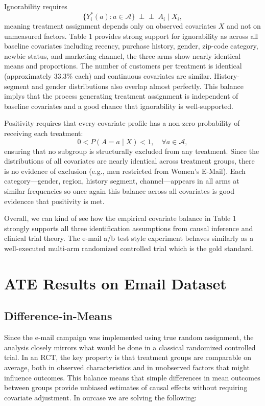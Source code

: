 \documentclass[10pt]{article}
\begin{document}
Ignorability requires
\[
\{Y_i^\ast(a) : a \in \mathcal{A}\} \;\perp\!\!\!\perp\; A_i \mid X_i,
\]
meaning treatment assignment depends only on observed covariates \(X\) and not on unmeasured factors. Table 1 provides strong support for ignorability as across all baseline covariates including recency, purchase history, gender, zip-code category, newbie status, and marketing channel, the three arms show nearly identical means and proportions. The number of customers per treatment is identical (approximately 33.3\% each) and continuous covariates are similar. History-segment and gender distributions also overlap almost perfectly. This balance implys that the process generating treatment assignment is independent of baseline covariates and a good chance that ignorability is well-supported.

Positivity requires that every covariate profile has a non-zero probability of receiving each treatment:
\[
0 < P(A = a \mid X) < 1, \quad \forall a \in \mathcal{A},
\]
ensuring that no subgroup is structurally excluded from any treatment. Since
 the distributions of all covariates are nearly identical across treatment groups, there is no evidence of exclusion (e.g., men restricted from Women's E-Mail). Each category—gender, region, history segment, channel—appears in all arms at similar frequencies so once again this balance across all covariates is good evidencce that positivity is met.


Overall, we can kind of see how the empirical covariate balance in Table 1 strongly supports all three identification assumptions from causal inference and clinical trial theory. The e-mail a/b test style experiment behaves similarly as a well-executed multi-arm randomized controlled trial which is the gold standard.




\section{ATE Results on Email Dataset}
\subsection{Difference-in-Means}

Since the e-mail campaign was implemented using true random assignment, the analysis closely mirrors what would be done in a classical randomized controlled trial. In an RCT, the key property is that treatment groups are comparable on average, both in observed characteristics and in unobserved factors that might influence outcomes. This balance means that simple differences in mean outcomes between groups provide unbiased estimates of causal effects without requiring covariate adjustment. In ourcase we are solving the following:
\end{document}
